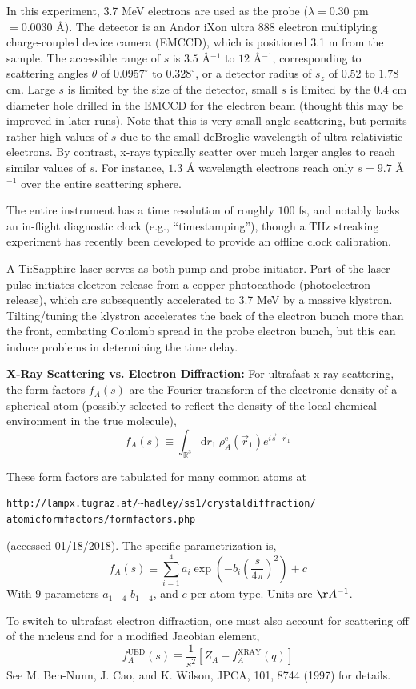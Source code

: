 \documentclass[fleqn,oneside,12pt]{article}
\begin{document}
In this experiment, 3.7 MeV electrons are used as the probe ($\lambda = 0.30$ pm
$= 0.0030$ \AA{}). The detector is an Andor iXon ultra 888 electron multiplying
charge-coupled device camera (EMCCD), which is positioned 3.1 m from the sample.
The accessible range of $s$ is $3.5$ \AA{}$^{-1}$ to $12$ \AA{}$^{-1}$,
corresponding to scattering angles $\theta$ of $0.0957^{\circ}$ to
$0.328^{\circ}$, or a detector radius of $s_{z}$ of $0.52$ to $1.78$ cm. Large
$s$ is limited by the size of the detector, small $s$ is limited by the $0.4$ cm
diameter hole drilled in the EMCCD for the electron beam (thought this may be
improved in later runs). Note that this is very small angle scattering, but
permits rather high values of $s$ due to the small deBroglie wavelength of
ultra-relativistic electrons. By contrast, x-rays typically scatter over much
larger angles to reach similar values of $s$. For instance, $1.3$ \AA{}
wavelength electrons reach only $s = 9.7$ \AA{}$^{-1}$ over the entire
scattering sphere.

The entire instrument has a time resolution of roughly $100$ fs, and notably
lacks an in-flight diagnostic clock (e.g., ``timestamping''), though a THz
streaking experiment has recently been developed to provide an offline clock
calibration. 

A Ti:Sapphire laser serves as both pump and probe initiator. Part of the laser
pulse initiates electron release from a copper photocathode (photoelectron
release), which are subsequently accelerated to 3.7 MeV by a massive klystron.
Tilting/tuning the klystron accelerates the back of the electron bunch more than
the front, combating Coulomb spread in the probe electron bunch, but this can
induce problems in determining the time delay. 

\textbf{X-Ray Scattering vs. Electron Diffraction:} For ultrafast x-ray
scattering, the form factors $f_{A} (s)$ are the Fourier transform of the
electronic density of a spherical atom (possibly selected to reflect the density
of the local chemical environment in the true molecule),
\[
f_{A} (s)
\equiv
\int_{\mathbb{R}^3}
\mathrm{d} r_1
\
\rho_{A}^{\mathrm{e}} (\vec r_{1})
e^{i \vec s \cdot \vec r_1}
\]

These form factors are tabulated for many common atoms at
\begin{verbatim}
http://lampx.tugraz.at/~hadley/ss1/crystaldiffraction/
atomicformfactors/formfactors.php
\end{verbatim}
(accessed 01/18/2018). The specific parametrization is,
\[
f_{A} (s)
\equiv
\sum_{i=1}^{4}
a_{i}
\exp
\left (
-b_{i}
\left (
\frac{s}{4\pi}
\right )^2
\right )
+
c
\]
With 9 parameters $a_{1-4}$ $b_{1-4}$, and $c$ per atom type. Units are
$\AA{}^{-1}$.

To switch to ultrafast electron diffraction, one must also account for
scattering off of the nucleus and for a modified Jacobian element,
\[
f_{A}^{\mathrm{UED}}
(s)
\equiv
\frac{1}{s^2}
\left [
Z_{A}
-
f_{A}^{\mathrm{XRAY}}
(q)
\right ]
\]
See M. Ben-Nunn, J. Cao, and K. Wilson, JPCA, 101, 8744 (1997) for details.
\end{document}
